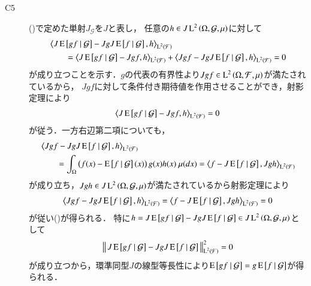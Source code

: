 \begin{prf}
\begin{description}
			\item[C5] ()で定めた単射$J_{\mathcal{G}}$を$J$と表し，
				任意の$h \in J\operatorname{L}^{2} \left(\Omega, \mathcal{G},\mu\right)$に対して
				\begin{align}
					&\inprod<J\cexp{gf}{\mathcal{G}} - Jg J\cexp{f}{\mathcal{G}}, h>_{\Lp{2}{\mathcal{F}}} \\
					&\qquad = \inprod<J\cexp{gf}{\mathcal{G}} - Jg f, h>_{\Lp{2}{\mathcal{F}}} + \inprod<Jg f - Jg J\cexp{f}{\mathcal{G}}, h>_{\Lp{2}{\mathcal{F}}}
					= 0
					\label{eq:prp_L2_conditional_expectation_C5}
				\end{align}
				が成り立つことを示す．$g$の代表の有界性より$Jg f \in \operatorname{L}^{2} \left(\Omega, \mathcal{F},\mu\right)$が満たされているから，
				$Jg f$に対して条件付き期待値を作用させることができ，射影定理により
				\begin{align}
					\inprod<J\cexp{gf}{\mathcal{G}} - Jg f, h>_{\Lp{2}{\mathcal{F}}} = 0
				\end{align}
				が従う．一方右辺第二項についても，
				\begin{align}
					&\inprod<Jg f - Jg J\cexp{f}{\mathcal{G}}, h>_{\Lp{2}{\mathcal{F}}} \\
					&\qquad = \int_{\Omega} \left( f(x) - \cexp{f}{\mathcal{G}}(x) \right) g(x)h(x)\ \mu(dx)
					= \inprod<f - J\cexp{f}{\mathcal{G}}, Jg h>_{\Lp{2}{\mathcal{F}}}
				\end{align}
				が成り立ち，$Jg h \in J\operatorname{L}^{2} \left(\Omega, \mathcal{G},\mu\right)$が満たされているから射影定理により
				\begin{align}
					\inprod<Jg f - Jg J\cexp{f}{\mathcal{G}}, h>_{\Lp{2}{\mathcal{F}}} 
					= \inprod<f - J\cexp{f}{\mathcal{G}}, Jg h>_{\Lp{2}{\mathcal{F}}} = 0
				\end{align}
				が従い()が得られる．
				特に$h = J\operatorname{E} \left[ gf \ \middle|\ \mathcal{G} \right] - Jg J\operatorname{E} \left[ f \ \middle|\ \mathcal{G} \right] \in J\operatorname{L}^{2} \left(\Omega, \mathcal{G},\mu\right)$として
				\begin{align}
					\left\|\, J\operatorname{E} \left[ gf \ \middle|\ \mathcal{G} \right] - Jg J\operatorname{E} \left[ f \ \middle|\ \mathcal{G} \right]\, \right\|_{\operatorname{L}^{2} \left(\mathcal{F}\right)}^2 = 0
				\end{align}
				が成り立つから，環準同型$J$の線型等長性により$\operatorname{E} \left[ gf \ \middle|\ \mathcal{G} \right] = g\operatorname{E} \left[ f \ \middle|\ \mathcal{G} \right]$が得られる．
			

\end{description}
\end{prf}
